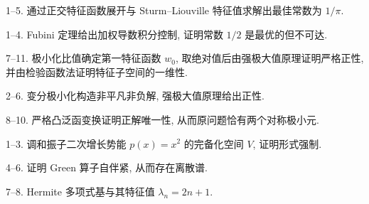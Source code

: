 
1--5. 通过正交特征函数展开与 Sturm--Liouville 特征值求解出最佳常数为 $1/\pi$.


1--4. Fubini 定理给出加权导数积分控制, 证明常数 $1/2$ 是最优的但不可达.


7--11. 极小化比值确定第一特征函数 $w_0$, 取绝对值后由强极大值原理证明严格正性, 并由检验函数法证明特征子空间的一维性.


2--6. 变分极小化构造非平凡非负解, 强极大值原理给出正性.

8--10. 严格凸泛函变换证明正解唯一性, 从而原问题恰有两个对称极小元.


1--3. 调和振子二次增长势能 $p(x)=x^2$ 的完备化空间 $V$, 证明形式强制.

4--6. 证明 Green 算子自伴紧, 从而存在离散谱.

7--8. Hermite 多项式基与其特征值 $\lambda_n=2n+1$.
